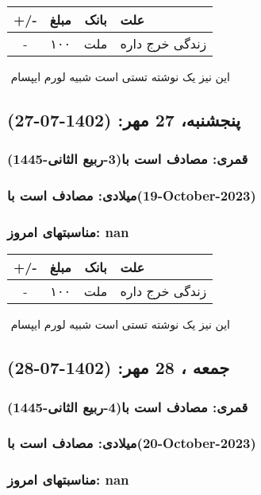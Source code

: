 \documentclass{article}
\newcommand{\rnote}[1]{\marginpar{\textcolor{color}{\StrSubstitute{\##1}{ }{\_}}}}
\newcommand{\myRow}[4]{
    #1 & #2 & #3 & #4 \\ \hline
}
\begin{document}
\begin{tabular}{ | c | c | c | p{5cm} |}
    \hline
    \myRow{ +/- }{مبلغ}{بانک}{علت}
    \myRow{-}{۱۰۰}{ملت}{زندگی خرج داره}
\end{tabular}
\newline
\newline

‌
\rnote{تست}
این نیز یک نوشته تستی است شبیه لورم ایپسام




\newpage
{}
\textcolor{color}{
\section{ پنجشنبه، 27 مهر: (1402-07-27) }
\subsubsection*{قمری: مصادف است با(3-ربیع الثانی-1445)} 
\subsubsection*{میلادی: مصادف است با(19-October-2023)}
\subsubsection*{مناسبتهای امروز: nan}
}


\begin{tabular}{ | c | c | c | p{5cm} |}
    \hline
    \myRow{ +/- }{مبلغ}{بانک}{علت}
    \myRow{-}{۱۰۰}{ملت}{زندگی خرج داره}
\end{tabular}
\newline
\newline

‌
\rnote{تست}
این نیز یک نوشته تستی است شبیه لورم ایپسام




\newpage
{}
\textcolor{color}{
\section{ جمعه ، 28 مهر: (1402-07-28) }
\subsubsection*{قمری: مصادف است با(4-ربیع الثانی-1445)} 
\subsubsection*{میلادی: مصادف است با(20-October-2023)}
\subsubsection*{مناسبتهای امروز: nan}
}
\end{document}
